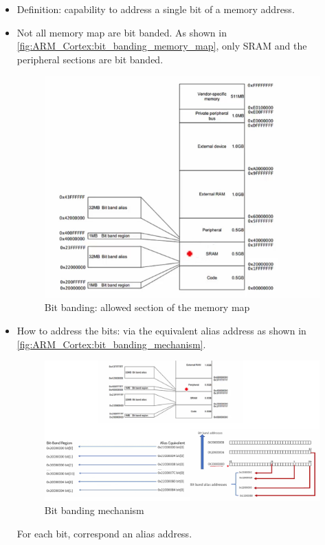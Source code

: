 \begin{itemize}
    \item Definition: capability to address a single bit of a memory address.

    \item Not all memory map are bit banded. As shown in \autoref{fig:ARM_Cortex:bit_banding_memory_map}, only SRAM and the peripheral sections are bit banded. 


\begin{figure}[h]
\centering
\includegraphics[scale=0.7]{Figures/ARM_Cortex/bit_banding_memory_map}
\caption{Bit banding: allowed section of the memory map}
\label{fig:ARM_Cortex:bit_banding_memory_map}
\end{figure}

\newpage
\item How to address the bits: via the equivalent alias address as shown in \autoref{fig:ARM_Cortex:bit_banding_mechanism}.

\begin{figure}[h]
\centering
\includegraphics[scale=0.5]{Figures/ARM_Cortex/bit_banding_mechanism}
\caption{Bit banding mechanism}
\label{fig:ARM_Cortex:bit_banding_mechanism}
\end{figure}

For each bit, correspond an alias address.
    
\end{itemize}


